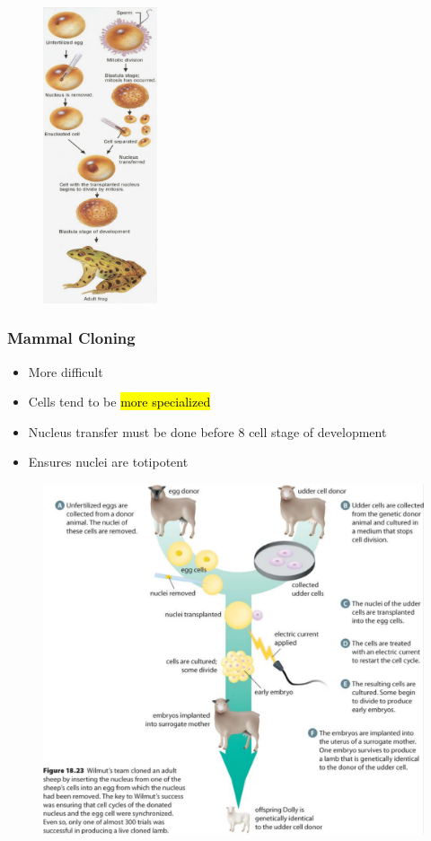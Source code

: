 \documentclass[a4paper,12pt]{article}
\begin{document}
\begin{figure}[H]
    \centering
    \includegraphics[width=0.3\textwidth]{clone}
\end{figure}

\subsubsection{Mammal Cloning}
\begin{itemize}
    \item{More difficult}
    \item{Cells tend to be \hl{more specialized}}
    \item{Nucleus transfer must be done before 8 cell stage of development}
    \item{Ensures nuclei are totipotent}
\end{itemize}

\begin{figure}[H]
    \centering
    \includegraphics[width=\textwidth]{clone2}
\end{figure}
\end{document}
